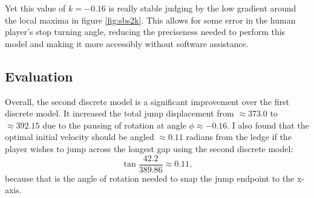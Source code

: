 Yet this value of $k=-0.16$ is really stable judging by the low gradient around the local maxima in figure \ref{fig:sbs2k}. This allows for some error in the human player's stop turning angle, reducing the preciseness needed to perform this model and making it more accessibly without software assistance.


%
%
%
%
%

\subsection{Evaluation}
Overall, the second discrete model is a significant improvement over the first discrete model. It increased the total jump displacement from $\approx 373.0$ to $\approx 392.15$ due to the pausing of rotation at angle $\phi \approx -0.16$. I also found that the optimal initial velocity should be angled $\approx 0.11$ radians from the ledge if the player wishes to jump across the longest gap using the second discrete model:
\[
    \tan \frac{42.2}{389.86} \approx 0.11,
\]
because that is the angle of rotation needed to snap the jump endpoint to the x-axis.

